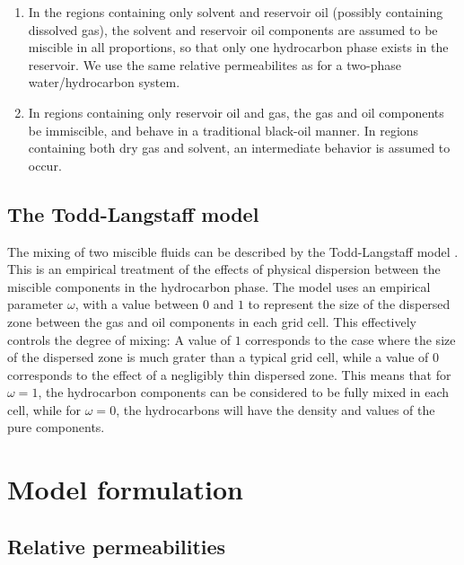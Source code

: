 \documentclass[11pt, a4paper]{article}
\begin{document}
\begin{enumerate}[label=\emph{(\roman*)}]
\item In the regions containing only solvent and reservoir oil (possibly containing dissolved gas),
  the solvent and reservoir oil components are assumed to be miscible in all proportions, so that
  only one hydrocarbon phase exists in the reservoir. We use the same relative permeabilites as for
  a two-phase water/hydrocarbon system.
\item In regions containing only reservoir oil and gas, the gas and oil components be immiscible,
  and behave in a traditional black-oil manner. In regions containing both dry gas and solvent, an
  intermediate behavior is assumed to occur.
\end{enumerate}

\subsection*{The Todd-Langstaff model}

The mixing of two miscible fluids can be described by the Todd-Langstaff model
\cite{todd1972development}. This is an empirical treatment of the effects of physical dispersion
between the miscible components in the hydrocarbon phase. The model uses an empirical parameter
$\omega$, with a value between $0$ and $1$ to represent the size of the dispersed zone between the
gas and oil components in each grid cell. This effectively controls the degree of mixing: A value of
$1$ corresponds to the case where the size of the dispersed zone is much grater than a typical grid
cell, while a value of $0$ corresponds to the effect of a negligibly thin dispersed zone. This means
that for $\omega = 1$, the hydrocarbon components can be considered to be fully mixed in each cell,
while for $\omega = 0$, the hydrocarbons will have the density and values of the pure components.

\section{Model formulation}

\subsection*{Relative permeabilities}
\end{document}
